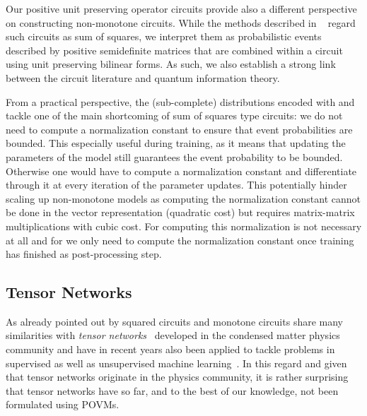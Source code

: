 Our positive unit preserving operator circuits provide also a different perspective on constructing non-monotone circuits. While the methods described in ~\citep{sladek2023encoding,loconte2024subtractive,loconte2024sum,wangrelationship} regard such circuits as sum of squares, we interpret them as probabilistic events described by positive semidefinite matrices that are combined within a circuit using unit preserving bilinear forms. As such, we also establish a strong link between the circuit literature and quantum information theory.

From a practical perspective, the (sub-complete) distributions encoded with \puncs and \noisepuncs tackle one of the main shortcoming of sum of squares type circuits: we do not need to compute a normalization constant to ensure that event probabilities are bounded. This especially useful during training, as it means that updating the parameters of the model still guarantees the event probability to be bounded. Otherwise one would have to compute a normalization constant and differentiate through it at every iteration of the parameter updates. This potentially hinder scaling up non-monotone models as computing the normalization constant cannot be done in the vector representation (quadratic cost) but requires matrix-matrix multiplications with cubic cost. For \puncs computing this normalization is not necessary at all and for \noisepunc we only need to compute the normalization constant once training has finished as post-processing step.

\subsection{Tensor Networks}

As already pointed out by \citet{loconte2024subtractive,loconte2024sum} squared circuits and monotone circuits share many similarities with \textit{tensor networks}~\citep{orus2014practical,white1992density}
developed in the condensed matter physics community and have in recent years also been applied to tackle problems in supervised as well as unsupervised machine learning~\citep{cheng2019tree,han2018unsupervised,stoudenmire2016supervised}. In this regard and given that tensor networks originate in the physics community, it is rather surprising that tensor networks have so far, and to the best of our knowledge, not been formulated using POVMs.

